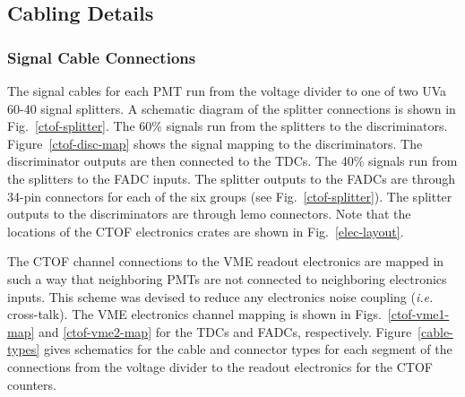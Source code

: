 \documentclass[12pt]{article}
\begin{document}
\subsection{Cabling Details}

\subsubsection{Signal Cable Connections}
\label{signal-conn}

The signal cables for each PMT run from the voltage divider to one of two UVa 60-40 signal splitters. A
schematic diagram of the splitter connections is shown in Fig.~\ref{ctof-splitter}. The 60\% signals run
from the splitters to the discriminators. Figure~\ref{ctof-disc-map} shows the signal mapping to the
discriminators. The discriminator outputs are then connected to the TDCs. The 40\% signals run from the
splitters to the FADC inputs. The splitter outputs to the FADCs are through 34-pin connectors for each of
the six groups (see Fig.~\ref{ctof-splitter}). The splitter outputs to the discriminators are through
lemo connectors. Note that the locations of the CTOF electronics crates are shown in Fig.~\ref{elec-layout}.

The CTOF channel connections to the VME readout electronics are mapped in such a way that neighboring PMTs
are not connected to neighboring electronics inputs. This scheme was devised to reduce any electronics noise
coupling ({\it i.e.} cross-talk). The VME electronics channel mapping is shown in Figs.~\ref{ctof-vme1-map}
and \ref{ctof-vme2-map} for the TDCs and FADCs, respectively. Figure~\ref{cable-types} gives schematics for
the cable and connector types for each segment of the connections from the voltage divider to the readout
electronics for the CTOF counters.
\end{document}
